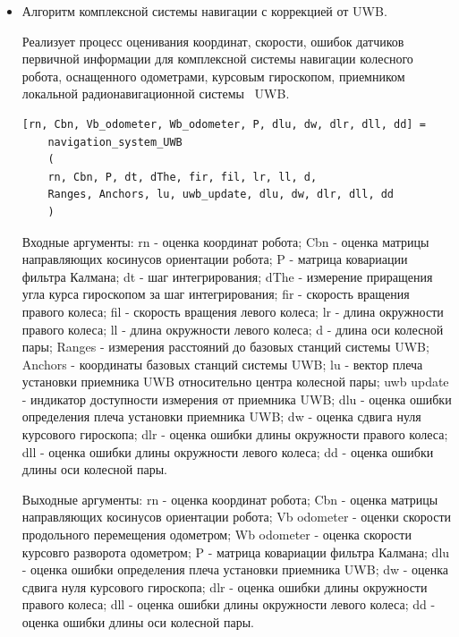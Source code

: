 \documentclass[14pt]{article}
\begin{document}
\begin{itemize}
  Выходные аргументы: rn - оценка координат робота; Cbn - оценка матрицы направляющих косинусов ориентации робота; Vb odometer - оценки скорости продольного перемещения одометром; Wb odometer - оценка скорости курсовго разворота одометром; P - матрица ковариации фильтра Калмана; dw - оценка сдвига нуля курсового гироскопа; dlr - оценка ошибки длины окружности правого колеса; dll - оценка ошибки длины окружности левого колеса.

\item Алгоритм комплексной системы навигации с коррекцией от UWB.

Реализует процесс оценивания координат, скорости, ошибок датчиков первичной информации для комплексной системы навигации колесного робота, оснащенного одометрами, курсовым гироскопом, приемником локальной радионавигационной системы  UWB.

\begin{verbatim}
[rn, Cbn, Vb_odometer, Wb_odometer, P, dlu, dw, dlr, dll, dd] = 
    navigation_system_UWB
    (
    rn, Cbn, P, dt, dThe, fir, fil, lr, ll, d,
    Ranges, Anchors, lu, uwb_update, dlu, dw, dlr, dll, dd
    )
\end{verbatim}

 Входные аргументы: rn - оценка координат робота; Cbn - оценка матрицы направляющих косинусов ориентации робота; P - матрица ковариации фильтра Калмана;
dt - шаг интегрирования; dThe - измерение приращения угла курса гироскопом за шаг интегрирования; fir - скорость вращения правого колеса; fil - скорость вращения левого колеса;
lr - длина окружности правого колеса; ll - длина окружности левого колеса; d - длина оси колесной пары; Ranges - измерения расстояний до базовых станций системы UWB;
Anchors - координаты базовых станций системы UWB; lu - вектор плеча установки приемника UWB относительно центра колесной пары;
uwb update - индикатор доступности измерения от приемника UWB; dlu - оценка ошибки определения плеча установки приемника UWB; dw - оценка сдвига нуля курсового гироскопа;
dlr - оценка ошибки длины окружности правого колеса; dll - оценка ошибки длины окружности левого колеса; dd - оценка ошибки длины оси колесной пары.

Выходные аргументы: rn - оценка координат робота; Cbn - оценка матрицы направляющих косинусов ориентации робота; Vb odometer - оценки скорости продольного перемещения одометром;
Wb odometer - оценка скорости курсовго разворота одометром; P - матрица ковариации фильтра Калмана; dlu - оценка ошибки определения плеча установки приемника UWB;
dw - оценка сдвига нуля курсового гироскопа; dlr - оценка ошибки длины окружности правого колеса; dll - оценка ошибки длины окружности левого колеса;
dd - оценка ошибки длины оси колесной пары. 


\end{itemize}
\end{document}

